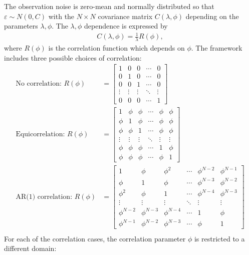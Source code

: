 \documentclass{book}
\begin{document}
The observation noise is zero-mean and normally distributed so that $\varepsilon \sim N\left(0, C\right)$
with the $N \times N$ covariance matrix $C(\lambda, \phi)$ depending on the parameters $\lambda, \phi$. The 
$\lambda,\phi$ dependence is expressed by
\begin{align*}
C(\lambda, \phi) = \frac{1}{\lambda}R(\phi),
\end{align*}
where $R(\phi)$ is the correlation function which depends on $\phi$. The framework includes three possible choices
of correlation:
\begin{align*}
\text{No correlation: } R(\phi) &= 
\begin{bmatrix} 
	1 & 0 & 0 & \cdots & 0 \\
	0 & 1 & 0 & \cdots & 0 \\
	0 & 0 & 1 & \cdots & 0 \\
	\vdots & \vdots & \vdots & \ddots & \vdots \\
	0 & 0 & 0 & \cdots & 1	
\end{bmatrix} \\
\text{Equicorrelation: } R(\phi) &= 
\begin{bmatrix}
	1    & \phi & \phi & \cdots  &\phi &  \phi \\
	\phi & 1    & \phi & \cdots  & \phi & \phi \\
	\phi & \phi    & 1 & \cdots  & \phi & \phi \\
	\vdots & \vdots & \vdots  & \ddots & \vdots & \vdots \\
	\phi & \phi & \phi & \cdots & 1 & \phi \\
	\phi & \phi & \phi & \cdots & \phi & 1 	
\end{bmatrix}\\
\text{AR(1) correlation: } R(\phi) &= 
\begin{bmatrix}
	1    & \phi & \phi^2 & \cdots  &\phi^{N-2} &  \phi^{N-1} \\
	\phi & 1    & \phi & \cdots  & \phi^{N-3} & \phi^{N-2} \\
	\phi^2 & \phi    & 1 & \cdots  & \phi^{N-4} & \phi^{N-3} \\
	\vdots & \vdots & \vdots  & \ddots & \vdots & \vdots \\
	\phi^{N-2} & \phi^{N-3} & \phi^{N-4} & \cdots & 1 & \phi \\
	\phi^{N-1} & \phi^{N-2} & \phi^{N-3} & \cdots & \phi & 1 	
\end{bmatrix}\\
\end{align*}
For each of the correlation cases, the correlation parameter $\phi$ is restricted to a different domain:
\end{document}
